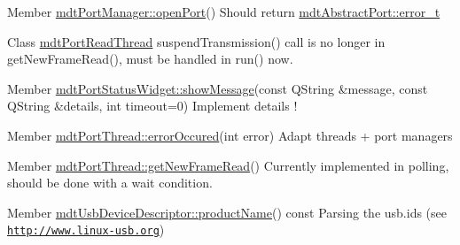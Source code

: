 \label{todo__todo000024}
\hypertarget{todo__todo000024}{}
 
\begin{DoxyDescription}
\item[Member \hyperlink{classmdt_port_manager_aab594613e8985590c835194efbc27b5e}{mdtPortManager::openPort}() ]Should return \hyperlink{classmdt_abstract_port_ad4121bb930c95887e77f8bafa065a85e}{mdtAbstractPort::error\_\-t} 
\end{DoxyDescription}

\label{todo__todo000025}
\hypertarget{todo__todo000025}{}
 
\begin{DoxyDescription}
\item[Class \hyperlink{classmdt_port_read_thread}{mdtPortReadThread} ]suspendTransmission() call is no longer in getNewFrameRead(), must be handled in run() now. 
\end{DoxyDescription}

\label{todo__todo000026}
\hypertarget{todo__todo000026}{}
 
\begin{DoxyDescription}
\item[Member \hyperlink{classmdt_port_status_widget_a8fce28ddb290512f5681cf800ac17b81}{mdtPortStatusWidget::showMessage}(const QString \&message, const QString \&details, int timeout=0) ]Implement details ! 
\end{DoxyDescription}

\label{todo__todo000027}
\hypertarget{todo__todo000027}{}
 
\begin{DoxyDescription}
\item[Member \hyperlink{classmdt_port_thread_ab31cbe1a85aa830cd368654d1f806326}{mdtPortThread::errorOccured}(int error) ]Adapt threads + port managers
\end{DoxyDescription}

\label{todo__todo000028}
\hypertarget{todo__todo000028}{}
 
\begin{DoxyDescription}
\item[Member \hyperlink{classmdt_port_thread_a611211e56620ec9c699019452716e4fc}{mdtPortThread::getNewFrameRead}() ]Currently implemented in polling, should be done with a wait condition.
\end{DoxyDescription}

\label{todo__todo000031}
\hypertarget{todo__todo000031}{}
 
\begin{DoxyDescription}
\item[Member \hyperlink{classmdt_usb_device_descriptor_a626afc71d8e72600f12259ac6f5a5866}{mdtUsbDeviceDescriptor::productName}() const  ]Parsing the usb.ids (see \href{http://www.linux-usb.org}{\tt http://www.linux-\/usb.org}) 
\end{DoxyDescription}

